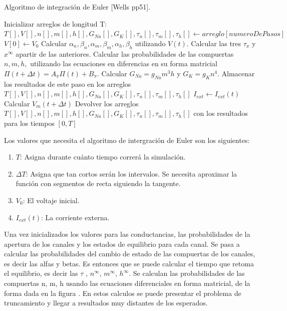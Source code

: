 \begin{algorithm}
  \caption{Algoritmo de integración de Euler [Wells pp51].}\label{AIE}
  \begin{algorithmic}[1]
    \State Inicializar arreglos de longitud T: $T[],V[],n[],m[],h[],G_{Na}[],G_{K}[],\tau_{n}[],\tau_{m}[],\tau_{h}[] \gets arreglo[numeroDePasos] $
    \State  $V[0] \gets V_{0}$
        \State Calcular $\alpha_{n}, \beta_{n}, \alpha_{m}, \beta_{m},\alpha_{h}, \beta_{h} $ utilizando $V(t)$.
        \State Calcular las tres $\tau_{x} $ y $x^\infty $ apartir de las anteriores.
        \State Calcular las probabilidades de las compuertas $n, m, h, $ utilizando las ecuaciones en diferencias en su forma matricial $\Pi(t + \Delta t) = A_{\pi}\Pi(t) + B_{\pi}$.
        \State Calcular $G_{Na} = g_{Na}m^3h $ y $G_{K} = g_{K}n^4 $.
        \State Almacenar los resultados de este paso en los arreglos $T[], V[], n[], m[], h[], G_{Na}[], G_{K}[], \tau_{n}[], \tau_{m}[], \tau_{h}[] $
        \State $I_{ext} \gets I_{ext}(t) $
        \State Calcular $V_{m} (t + \Delta t) $
    \EndFor
    \State Devolver los arreglos $T[],V[],n[],m[],h[],G_{Na}[],G_{K}[],\tau_{n}[],\tau_{m}[],\tau_{h}[] $ con los resultados para los tiempos $[0,T] $
    \EndFunction
  \end{algorithmic}
\end{algorithm}

Los valores que necesita el algoritmo de intergración de Euler son los siguientes:

\begin{enumerate}
 \item $T$:  Asigna durante cuánto tiempo correrá la simulación.
 \item $\Delta T $: Asigna que tan cortos serán los intervalos. Se necesita aproximar la función con segmentos de recta siguiendo la tangente. 
 \item $V_{0} $: El voltaje inicial.
 \item $I_{ext}(t) $: La corriente externa.
\end{enumerate}

Una vez inicializados los valores para las conductancias, las probabilidades de la apertura de los canales y los estados de equilibrio para cada canal. Se pasa a calcular las probabilidades del cambio de estado de las compuertas de los canales, es decir 
 las alfas y betas. Es entonces que se puede calcular el tiempo que retoma el equilibrio, es decir las $\tau$ , $n^{\infty}$, $m^{\infty}$, $h^{\infty}$. Se calculan las probabilidades de las compuertas n, m, h usando las ecuaciones diferenciales en forma matricial, de la forma dada en la figura . En estos calculos se puede presentar el problema de truncamiento y llegar a resultados muy distantes de los esperados.


